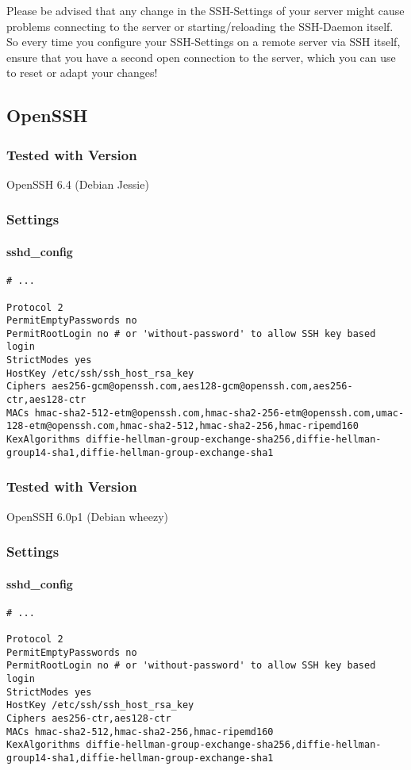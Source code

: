 \begin{mdframed}[style=warningboxstyle]
	Please be advised that any change in the SSH-Settings of your server might cause problems connecting to the server or starting/reloading the SSH-Daemon itself.
	So every time you configure your SSH-Settings on a remote server via SSH itself, ensure that you have a second open connection to the server, which you can use to reset or adapt your changes!
\end{mdframed}

\subsection{OpenSSH}

\subsubsection{Tested with Version} OpenSSH 6.4 (Debian Jessie)
\subsubsection{Settings}
\paragraph*{sshd\_config}
\begin{lstlisting}[breaklines]
# ...

Protocol 2
PermitEmptyPasswords no
PermitRootLogin no # or 'without-password' to allow SSH key based login
StrictModes yes
HostKey /etc/ssh/ssh_host_rsa_key
Ciphers aes256-gcm@openssh.com,aes128-gcm@openssh.com,aes256-ctr,aes128-ctr
MACs hmac-sha2-512-etm@openssh.com,hmac-sha2-256-etm@openssh.com,umac-128-etm@openssh.com,hmac-sha2-512,hmac-sha2-256,hmac-ripemd160
KexAlgorithms diffie-hellman-group-exchange-sha256,diffie-hellman-group14-sha1,diffie-hellman-group-exchange-sha1
\end{lstlisting}
\subsubsection{Tested with Version} OpenSSH 6.0p1 (Debian wheezy)
\subsubsection{Settings}
\paragraph*{sshd\_config}
\begin{lstlisting}[breaklines]
# ...

Protocol 2
PermitEmptyPasswords no
PermitRootLogin no # or 'without-password' to allow SSH key based login
StrictModes yes
HostKey /etc/ssh/ssh_host_rsa_key
Ciphers aes256-ctr,aes128-ctr
MACs hmac-sha2-512,hmac-sha2-256,hmac-ripemd160
KexAlgorithms diffie-hellman-group-exchange-sha256,diffie-hellman-group14-sha1,diffie-hellman-group-exchange-sha1
\end{lstlisting}

